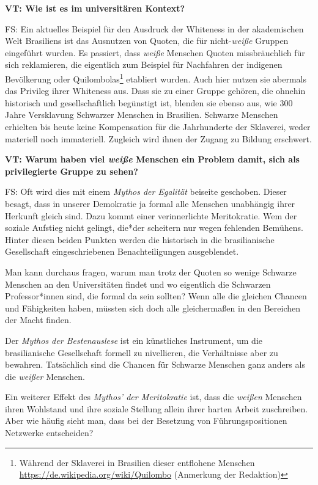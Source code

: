 \documentclass[a4paper,
fontsize=11pt,
oneside,
numbers=noperiodatend,
parskip=half-,
bibliography=totoc,
final
]{scrartcl}
\begin{document}
\textbf{VT: Wie ist es im universitären Kontext?}

FS: Ein aktuelles Beispiel für den Ausdruck der Whiteness in der
akademischen Welt Brasiliens ist das Ausnutzen von Quoten, die für
nicht-\emph{weiße} Gruppen eingeführt wurden. Es passiert, dass
\emph{weiße} Menschen Quoten missbräuchlich für sich reklamieren, die
eigentlich zum Beispiel für Nachfahren der indigenen Bevölkerung oder
Quilombolas\footnote{Während der Sklaverei in Brasilien dieser
  entflohene Menschen \url{https://de.wikipedia.org/wiki/Quilombo}
  (Anmerkung der Redaktion)} etabliert wurden. Auch hier nutzen sie
abermals das Privileg ihrer Whiteness aus. Dass sie zu einer Gruppe
gehören, die ohnehin historisch und gesellschaftlich begünstigt ist,
blenden sie ebenso aus, wie 300 Jahre Versklavung Schwarzer Menschen in
Brasilien. Schwarze Menschen erhielten bis heute keine Kompensation für
die Jahrhunderte der Sklaverei, weder materiell noch immateriell.
Zugleich wird ihnen der Zugang zu Bildung erschwert.

\textbf{VT: Warum haben viel \emph{weiße} Menschen ein Problem damit,
sich als privilegierte Gruppe zu sehen?}

FS: Oft wird dies mit einem \emph{Mythos der Egalität} beiseite
geschoben. Dieser besagt, dass in unserer Demokratie ja formal alle
Menschen unabhängig ihrer Herkunft gleich sind. Dazu kommt einer
verinnerlichte Meritokratie. Wem der soziale Aufstieg nicht gelingt,
die*der scheitern nur wegen fehlenden Bemühens. Hinter diesen beiden
Punkten werden die historisch in die brasilianische Gesellschaft
eingeschriebenen Benachteiligungen ausgeblendet.

Man kann durchaus fragen, warum man trotz der Quoten so wenige Schwarze
Menschen an den Universitäten findet und wo eigentlich die Schwarzen
Professor*innen sind, die formal da sein sollten? Wenn alle die gleichen
Chancen und Fähigkeiten haben, müssten sich doch alle gleichermaßen in
den Bereichen der Macht finden.

Der \emph{Mythos der Bestenauslese} ist ein künstliches Instrument, um
die brasilianische Gesellschaft formell zu nivellieren, die Verhältnisse
aber zu bewahren. Tatsächlich sind die Chancen für Schwarze Menschen
ganz anders als die \emph{weißer} Menschen.

Ein weiterer Effekt des \emph{Mythos' der Meritokratie} ist, dass die
\emph{weißen} Menschen ihren Wohlstand und ihre soziale Stellung allein
ihrer harten Arbeit zuschreiben. Aber wie häufig sieht man, dass bei der
Besetzung von Führungspositionen Netzwerke entscheiden?
\end{document}
